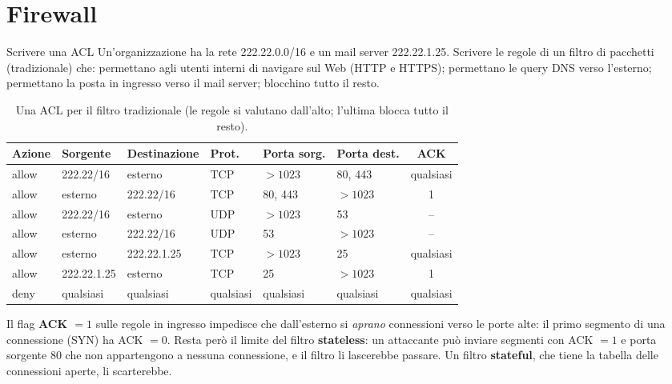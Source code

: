 \section{Firewall}

\begin{esercizio}{Scrivere una ACL}
Un'organizzazione ha la rete 222.22.0.0/16 e un mail server 222.22.1.25. Scrivere le regole di un filtro di pacchetti (tradizionale)
che: permettano agli utenti interni di navigare sul Web (HTTP e HTTPS); permettano le query DNS verso l'esterno; permettano la posta in
ingresso verso il mail server; blocchino tutto il resto.
\end{esercizio}

\svolgimento
\begin{table}[H]
\centering
\small
\begin{tabular}{llllllc}
\toprule
\textbf{Azione} & \textbf{Sorgente} & \textbf{Destinazione} & \textbf{Prot.} & \textbf{Porta sorg.} & \textbf{Porta dest.} & \textbf{ACK} \\
\midrule
allow & 222.22/16 & esterno & TCP & $> 1023$ & 80, 443 & qualsiasi \\
allow & esterno & 222.22/16 & TCP & 80, 443 & $> 1023$ & 1 \\
allow & 222.22/16 & esterno & UDP & $> 1023$ & 53 & -- \\
allow & esterno & 222.22/16 & UDP & 53 & $> 1023$ & -- \\
allow & esterno & 222.22.1.25 & TCP & $> 1023$ & 25 & qualsiasi \\
allow & 222.22.1.25 & esterno & TCP & 25 & $> 1023$ & 1 \\
deny & qualsiasi & qualsiasi & qualsiasi & qualsiasi & qualsiasi & qualsiasi \\
\bottomrule
\end{tabular}
\caption{Una ACL per il filtro tradizionale (le regole si valutano dall'alto; l'ultima blocca tutto il resto).}
\end{table}
Il flag \textbf{ACK $= 1$} sulle regole in ingresso impedisce che dall'esterno si \emph{aprano} connessioni verso le porte alte: il primo
segmento di una connessione (SYN) ha ACK $= 0$. Resta però il limite del filtro \textbf{stateless}: un attaccante può inviare segmenti
con ACK $= 1$ e porta sorgente 80 che non appartengono a nessuna connessione, e il filtro li lascerebbe passare. Un filtro
\textbf{stateful}, che tiene la tabella delle connessioni aperte, li scarterebbe.


